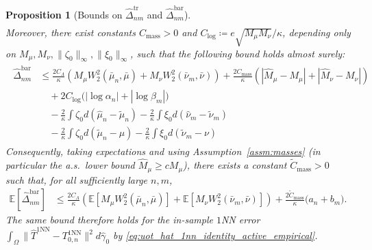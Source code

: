 \documentclass[11pt,reqno]{amsart}
\newtheorem{proposition}[theorem]{Proposition}
\theoremstyle{definition}
\renewcommand{\hat}{\widehat}
\renewcommand{\tilde}{\widetilde}
\newcommand{\Ep}{\mathbb{E}}
\begin{document}
\begin{proposition}[Bounds on $\hat\Delta_{nm}^{\mathrm{tr}}$ and $\hat\Delta_{nm}^{\mathrm{bar}}$]
\begin{align}
\end{align}
Moreover, there exist constants $C_{\mathrm{mass}}>0$ and
$C_{\mathrm{log}}\coloneqq e\sqrt{M_\mu M_\nu}/\kappa$, depending only on
$M_\mu,M_\nu,\|\zeta_0\|_\infty,\|\xi_0\|_\infty$, such that the following bound holds almost surely:
\begin{align}
\label{eq:uot_hat_barycentric_rate_bound}
\begin{aligned}
    \hat\Delta_{nm}^{\mathrm{bar}}
    &\le
    \frac{2C_\Lambda}{\kappa}
    \left(
        M_\mu W_2^2(\bar\mu_n,\bar\mu)+M_\nu W_2^2(\bar\nu_m,\bar\nu)
    \right)
    + \frac{2C_{\mathrm{mass}}}{\kappa}
    \left(
        |\hat M_\mu-M_\mu|+|\hat M_\nu-M_\nu|
    \right) \\
    &\quad+ 2C_{\mathrm{log}}\bigl(|\log\alpha_n|+|\log\beta_m|\bigr) \\
    &\quad - \frac{2}{\kappa} \int\zeta_0 d(\hat\mu_n-\tilde\mu_n)
            - \frac{2}{\kappa} \int\xi_0 d(\hat\nu_m-\tilde\nu_m) \\
    &\quad - \frac{2}{\kappa} \int\zeta_0 d(\tilde\mu_n-\mu)
            - \frac{2}{\kappa} \int\xi_0 d(\tilde\nu_m-\nu)
\end{aligned}
\end{align}
Consequently, taking expectations and using
Assumption~\ref{assm:masses} (in particular the a.s.\ lower bound $\hat M_\mu\ge cM_\mu$), there exists a
constant $\widetilde C_{\mathrm{mass}}>0$ such that, for all sufficiently large $n,m$,
\begin{align}
\label{eq:uot_hat_barycentric_expectation_bound}
    \Ep[\hat\Delta_{nm}^{\mathrm{bar}}]
    &\le
    \frac{2C_\Lambda}{\kappa}
    \left(
        \Ep[M_\mu W_2^2(\bar\mu_n,\bar\mu)] + \Ep[M_\nu W_2^2(\bar\nu_m,\bar\nu)]
    \right)
    + \frac{2\widetilde C_{\mathrm{mass}}}{\kappa}\bigl(a_n+b_m\bigr).
\end{align}
The same bound therefore holds for the in-sample $1$NN error
\(
\int_\Omega \|\hat T^{\mathrm{1NN}}-T_{0,n}^{\mathrm{1NN}}\|^2 d\hat\gamma_0
\)
by \eqref{eq:uot_hat_1nn_identity_active_empirical}.
\end{proposition}
\end{document}
